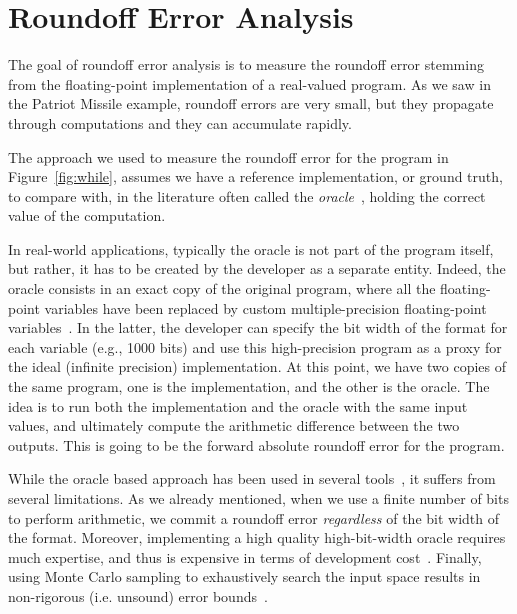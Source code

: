 \section{Roundoff Error Analysis}
%
The goal of roundoff error analysis is to measure the roundoff error stemming from the floating-point implementation of a real-valued program.
%
As we saw in the Patriot Missile example, roundoff errors are very small, but they propagate through computations and they can accumulate rapidly.
%
%
%

The approach we used to measure the roundoff error for the program in Figure~\ref{fig:while}, assumes we have a reference implementation, or ground truth, to compare with, in the literature often called the \emph{oracle}~\cite{blame}, holding the correct value of the computation.
%
% 

In real-world applications, typically the oracle is not part of the program itself, but rather, it has to be created by the developer as a separate entity.
%
Indeed, the oracle consists in an exact copy of the original program, where all the floating-point variables have been replaced by custom multiple-precision floating-point variables~\cite{mpfr}.
%
In the latter, the developer can specify the bit width of the format for each variable (e.g., 1000 bits) and use this high-precision program as a proxy for the ideal (infinite precision) implementation.
%
At this point, we have two copies of the same program, one is the implementation, and the other is the oracle. 
%
The idea is to run both the implementation and the oracle with the same input values, and ultimately compute the arithmetic difference between the two outputs. 
%
This is going to be the forward absolute roundoff error for the program. 
%

While the oracle based approach has been used in several tools~\cite{landau2014guide, kahan1996improbability, atomic, blame, herbie}, it suffers from several limitations.
%
As we already mentioned, when we use a finite number of bits to perform arithmetic, we commit a roundoff error \emph{regardless} of the bit width of the format.
%
%
Moreover, implementing a high quality high-bit-width oracle requires much expertise, and thus is expensive in terms of development cost~\cite{atomic}.
%
Finally, using Monte Carlo sampling to exhaustively search the input space results in non-rigorous (i.e. unsound) error bounds~\cite{glasserman2013monte, parker2000monte}.
%


